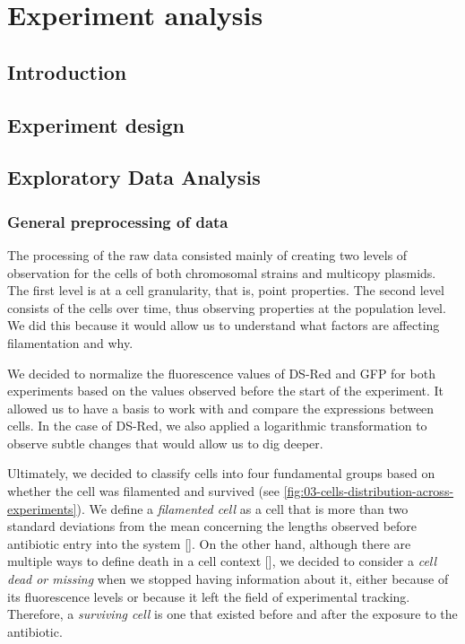 \documentclass[a4paper, nobind]{templates/ociamthesis}
\begin{document}
\adjustmtc
{}

\hypertarget{experiment-analysis}{%
\chapter{Experiment analysis}\label{experiment-analysis}}

\minitoc 

\hypertarget{introduction-1}{%
\section{Introduction}\label{introduction-1}}

\hypertarget{experiment-design}{%
\section{Experiment design}\label{experiment-design}}

\hypertarget{exploratory-data-analysis}{%
\section{Exploratory Data Analysis}\label{exploratory-data-analysis}}

\hypertarget{general-preprocessing-of-data}{%
\subsection{General preprocessing of data}\label{general-preprocessing-of-data}}

The processing of the raw data consisted mainly of creating two levels of observation for the cells of both chromosomal strains and multicopy plasmids. The first level is at a cell granularity, that is, point properties. The second level consists of the cells over time, thus observing properties at the population level. We did this because it would allow us to understand what factors are affecting filamentation and why.

We decided to normalize the fluorescence values of DS-Red and GFP for both experiments based on the values observed before the start of the experiment. It allowed us to have a basis to work with and compare the expressions between cells. In the case of DS-Red, we also applied a logarithmic transformation to observe subtle changes that would allow us to dig deeper.

Ultimately, we decided to classify cells into four fundamental groups based on whether the cell was filamented and survived (see \ref{fig:03-cells-distribution-across-experiments}). We define a \emph{filamented cell} as a cell that is more than two standard deviations from the mean concerning the lengths observed before antibiotic entry into the system {[}{]}. On the other hand, although there are multiple ways to define death in a cell context {[}{]}, we decided to consider a \emph{cell dead or missing} when we stopped having information about it, either because of its fluorescence levels or because it left the field of experimental tracking. Therefore, a \emph{surviving cell} is one that existed before and after the exposure to the antibiotic.
\end{document}
